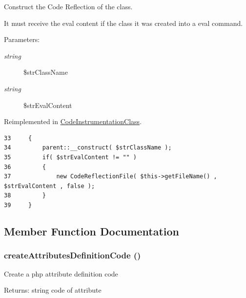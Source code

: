 Construct the Code Reflection of the class.

It must receive the eval content if the class it was created into a eval command.

\begin{Desc}
\item[Parameters:]
\begin{description}
\item[{\em string}]\$strClassName \item[{\em string}]\$strEvalContent \end{description}
\end{Desc}


Reimplemented in \hyperlink{class_code_instrumentation_class_4df49469648d1e8de92c18bb8ac40b1b}{CodeInstrumentationClass}.

\begin{Code}\begin{verbatim}33     {
34         parent::__construct( $strClassName );
35         if( $strEvalContent != "" )
36         {
37             new CodeReflectionFile( $this->getFileName() , $strEvalContent , false );
38         }
39     }
\end{verbatim}
\end{Code}




\subsection{Member Function Documentation}
\hypertarget{class_code_reflection_class_72b25801f6d2c909af2ee16b2b51ab8f}{
\subsubsection[{createAttributesDefinitionCode}]{\setlength{\rightskip}{0pt plus 5cm}createAttributesDefinitionCode ()}}
\label{class_code_reflection_class_72b25801f6d2c909af2ee16b2b51ab8f}


Create a php attribute definition code

\begin{Desc}
\item[Returns:]string code of attribute \end{Desc}


